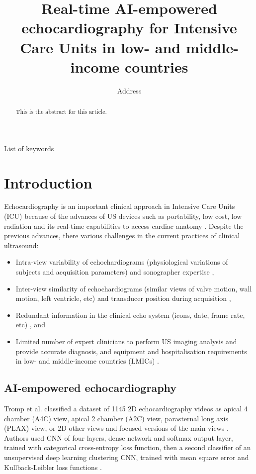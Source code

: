 \documentclass[mlabstract,twocolumn]{jmlr}
\title[Short Title]{
Real-time AI-empowered echocardiography for Intensive Care Units in low- and middle-income countries %
}
\author{
     \Name{Anonymous Author(s)} \Email{email@sample.com}
      \addr Address
   }
\begin{document}
\maketitle

\begin{abstract}
This is the abstract for this article.
\end{abstract}
\begin{keywords}
List of keywords
\end{keywords}

\section{Introduction}
\label{sec:intro}
Echocardiography is an important clinical approach in Intensive Care Units (ICU) because of the advances of US devices such as portability, low cost, low radiation and its real-time capabilities to access cardiac anatomy \citep{Feigenbaum1996, Vieillard-Baron2008, singh2007, cambell2018}.
Despite the previous advances, there various challenges in the current practices of clinical ultrasound:
\begin{itemize}
\setlength\itemsep{0em}
\item Intra-view variability of echochardiograms (physiological variations of subjects and acquisition parameters) and sonographer expertise \citep{khamis2017, Feigenbaum1996, field2011},
\item Inter-view similarity of echochardiograms (similar views of valve motion, wall motion, left ventricle, etc) and transducer position during acquisition \citep{zhang2018},
\item Redundant information in the clinical echo system (icons, date, frame rate, etc) \citep{khamis2017}, and
\item Limited number of expert clinicians to perform US imaging analysis and provide accurate diagnosis, and equipment and hospitalisation requirements in low- and middle-income countries (LMICs) \citep{hao2021-wellcome}.
\end{itemize}


\subsection{AI-empowered echocardiography}

Tromp et al. classified a dataset of 1145 2D echocardiography videos as apical 4 chamber (A4C) view, apical 2 chamber (A2C) view, parasternal long axis (PLAX) view, or 2D other views and focused versions of the main views \cite{tromp2022}.
Authors used CNN of four layers, dense network and softmax output layer, trained with categorical cross-entropy loss function, then a second classifier of an unsupervised deep learning clustering CNN, trained with mean square error and Kullback-Leibler loss functions \cite{tromp2022}.
\end{document}
